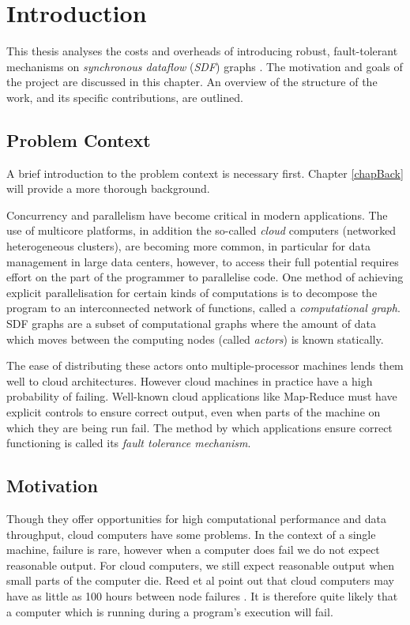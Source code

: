 \chapter{Introduction}

This thesis analyses the costs and overheads of introducing robust, fault-tolerant mechanisms on {\em synchronous dataflow} ({\em SDF}) graphs \cite{sdfBook}.
The motivation and goals of the project are discussed in this chapter.
An overview of the structure of the work, and its specific contributions, are outlined.

\section{Problem Context}

A brief introduction to the problem context is necessary first.
Chapter \ref{chapBack} will provide a more thorough background.

Concurrency and parallelism have become critical in modern applications.
The use of multicore platforms, in addition the so-called {\em cloud} computers (networked heterogeneous clusters), are becoming more common, in particular for data management in large data centers, however, to access their full potential requires effort on the part of the programmer to parallelise code.
One method of achieving explicit parallelisation for certain kinds of computations is to decompose the program to an interconnected network of functions, called a {\em computational graph}.
SDF graphs are a subset of computational graphs where the amount of data which moves between the computing nodes (called {\em actors}) is known statically.

The ease of distributing these actors onto multiple-processor machines lends them well to cloud architectures.
However cloud machines in practice have a high probability of failing.
Well-known cloud applications like Map-Reduce \cite{dea08} must have explicit controls to ensure correct output, even when parts of the machine on which they are being run fail.
The method by which applications ensure correct functioning is called its {\em fault tolerance mechanism}.

\section{Motivation}

Though they offer opportunities for high computational performance and data throughput, cloud computers have some problems.
In the context of a single machine, failure is rare, however when a computer does fail we do not expect reasonable output.
For cloud computers, we still expect reasonable output when small parts of the computer die.
Reed et al point out that cloud computers may have as little as 100 hours between node failures \cite{ree06}.
It is therefore quite likely that a computer which is running during a program's execution will fail.

